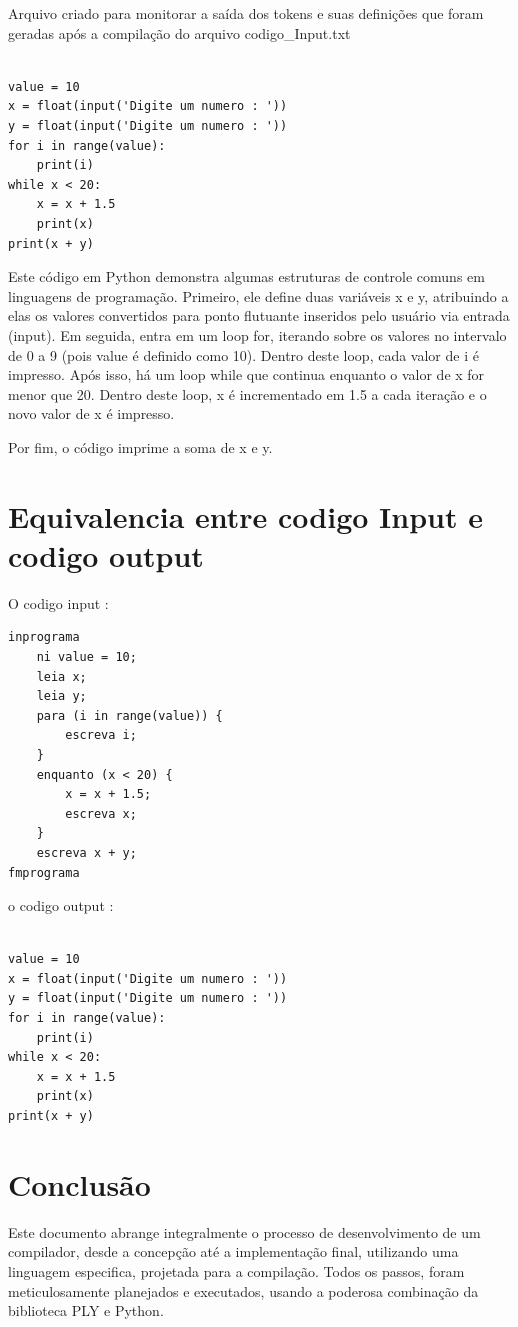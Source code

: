 \documentclass[a4paper,12pt]{article}
\begin{document}
Arquivo criado para monitorar a saída dos tokens e suas definições que 
foram geradas após a compilação do arquivo codigo\_Input.txt


\begin{Verbatim}

value = 10
x = float(input('Digite um numero : '))
y = float(input('Digite um numero : '))
for i in range(value):
    print(i)
while x < 20:
    x = x + 1.5
    print(x)
print(x + y)

\end{Verbatim}

Este código em Python demonstra algumas estruturas de controle comuns em 
linguagens de programação. Primeiro, ele define duas variáveis x e y, 
atribuindo a elas os valores convertidos para ponto flutuante inseridos 
pelo usuário via entrada (input). Em seguida, entra em um loop for, 
iterando sobre os valores no intervalo de 0 a 9 (pois value é definido 
como 10). Dentro deste loop, cada valor de i é impresso.
Após isso, há um loop while que continua enquanto o valor de x for menor 
que 20. Dentro deste loop, x é incrementado em 1.5 a cada iteração e o 
novo valor de x é impresso.

Por fim, o código imprime a soma de x e y.

\section{Equivalencia entre codigo Input e codigo output}
O codigo input : 
\begin{verbatim}
inprograma
    ni value = 10;
    leia x;
    leia y;
    para (i in range(value)) {
        escreva i;
    }
    enquanto (x < 20) {
        x = x + 1.5;
        escreva x;
    }
    escreva x + y;
fmprograma

\end{verbatim}
o codigo output : 
\begin{verbatim}
    
value = 10
x = float(input('Digite um numero : '))
y = float(input('Digite um numero : '))
for i in range(value):
    print(i)
while x < 20:
    x = x + 1.5
    print(x)
print(x + y)

\end{verbatim}


\section{Conclusão}

Este documento abrange integralmente o processo de desenvolvimento de um compilador, desde a concepção até a implementação final, utilizando uma linguagem especifica, projetada para a compilação. Todos os passos, foram meticulosamente planejados e executados, usando a poderosa combinação da biblioteca PLY e Python.\\
\end{document}
